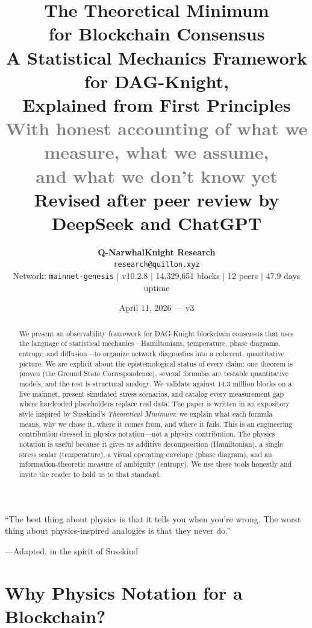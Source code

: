 \documentclass[11pt,a4paper]{article}
\title{%
\vspace{-1cm}
{\LARGE\textbf{The Theoretical Minimum\\for Blockchain Consensus}}\\[0.4cm]
{\large A Statistical Mechanics Framework for DAG-Knight,\\Explained from First Principles}\\[0.4cm]
{\normalsize\textcolor{gray}{With honest accounting of what we measure, what we assume,\\and what we don't know yet}}\\[0.3cm]
{\small\textcolor{sectionblue}{Revised after peer review by DeepSeek and ChatGPT}}
}
\author{%
\textbf{Q-NarwhalKnight Research}\\
\texttt{research@quillon.xyz}\\[0.2cm]
{\small Network: \texttt{mainnet-genesis} $\mid$ v10.2.8 $\mid$ 14,329,651 blocks $\mid$ 12 peers $\mid$ 47.9 days uptime}
}
\date{April 11, 2026 --- v3}
\begin{document}
\maketitle

\epigraph{``The best thing about physics is that it tells you when you're wrong. The worst thing about physics-inspired analogies is that they never do.''}{---Adapted, in the spirit of Susskind}

\begin{abstract}
We present an observability framework for DAG-Knight blockchain consensus that uses the language of statistical mechanics---Hamiltonians, temperature, phase diagrams, entropy, and diffusion---to organize network diagnostics into a coherent, quantitative picture. We are explicit about the epistemological status of every claim: one theorem is proven (the Ground State Correspondence), several formulas are testable quantitative models, and the rest is structural analogy. We validate against 14.3 million blocks on a live mainnet, present simulated stress scenarios, and catalog every measurement gap where hardcoded placeholders replace real data. The paper is written in an expository style inspired by Susskind's \emph{Theoretical Minimum}: we explain what each formula means, why we chose it, where it comes from, and where it fails. This is an engineering contribution dressed in physics notation---not a physics contribution. The physics notation is useful because it gives us additive decomposition (Hamiltonian), a single stress scalar (temperature), a visual operating envelope (phase diagram), and an information-theoretic measure of ambiguity (entropy). We use these tools honestly and invite the reader to hold us to that standard.
\end{abstract}

\tableofcontents
\newpage

\part{Why Physics Notation for a Blockchain?}

\end{document}
